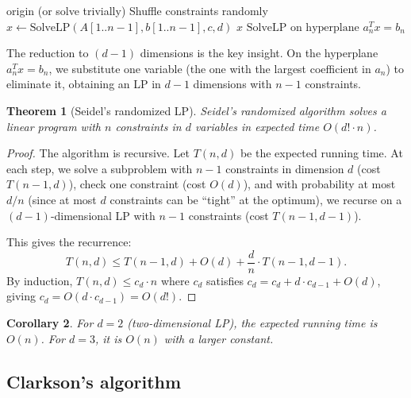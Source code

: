 \documentclass[twoside,12pt]{book}
\theoremstyle{plain}
\newtheorem{theorem}{Theorem}[chapter]
\newtheorem{corollary}[theorem]{Corollary}
\theoremstyle{definition}
\theoremstyle{remark}
\begin{document}
\begin{algorithm}
\caption{Seidel's Randomized LP Algorithm}
\label{alg:seidel-lp}
\begin{algorithmic}[1]
        \State \Return origin (or solve trivially)
    \EndIf
    \State Shuffle constraints randomly
    \State $x \leftarrow \text{SolveLP}(A[1..n-1], b[1..n-1], c, d)$ 
        \State \Return $x$ 
    \Else
        \State \Return $\text{SolveLP on hyperplane } a_n^T x = b_n$ 
    \EndIf
\EndFunction
\end{algorithmic}
\end{algorithm}

The reduction to $(d-1)$ dimensions is the key insight. On the hyperplane $a_n^T x = b_n$, we substitute one variable (the one with the largest coefficient in $a_n$) to eliminate it, obtaining an LP in $d-1$ dimensions with $n-1$ constraints.

\begin{theorem}[Seidel's randomized LP]
\label{thm:seidel-lp}
Seidel's randomized algorithm solves a linear program with $n$ constraints in $d$ variables in expected time $O(d! \cdot n)$.
\end{theorem}

\begin{proof}
The algorithm is recursive. Let $T(n, d)$ be the expected running time. At each step, we solve a subproblem with $n-1$ constraints in dimension $d$ (cost $T(n-1, d)$), check one constraint (cost $O(d)$), and with probability at most $d/n$ (since at most $d$ constraints can be ``tight'' at the optimum), we recurse on a $(d-1)$-dimensional LP with $n-1$ constraints (cost $T(n-1, d-1)$).

This gives the recurrence:
\[
T(n, d) \leq T(n-1, d) + O(d) + \frac{d}{n} \cdot T(n-1, d-1).
\]
By induction, $T(n, d) \leq c_d \cdot n$ where $c_d$ satisfies $c_d = c_d + d \cdot c_{d-1} + O(d)$, giving $c_d = O(d \cdot c_{d-1}) = O(d!)$.
\end{proof}

\begin{corollary}
For $d = 2$ (two-dimensional LP), the expected running time is $O(n)$. For $d = 3$, it is $O(n)$ with a larger constant.
\end{corollary}

\subsection{Clarkson's algorithm}
\end{document}
